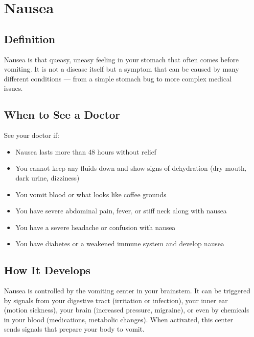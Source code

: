 \chapter{Nausea}

\section*{Definition}
Nausea is that queasy, uneasy feeling in your stomach that often comes before vomiting. It is not a disease itself but a symptom that can be caused by many different conditions — from a simple stomach bug to more complex medical issues.

\section*{When to See a Doctor}
See your doctor if:
\begin{itemize}
  \item Nausea lasts more than 48 hours without relief
  \item You cannot keep any fluids down and show signs of dehydration (dry mouth, dark urine, dizziness)
  \item You vomit blood or what looks like coffee grounds
  \item You have severe abdominal pain, fever, or stiff neck along with nausea
  \item You have a severe headache or confusion with nausea
  \item You have diabetes or a weakened immune system and develop nausea
\end{itemize}

\section*{How It Develops}
Nausea is controlled by the vomiting center in your brainstem. It can be triggered by signals from your digestive tract (irritation or infection), your inner ear (motion sickness), your brain (increased pressure, migraine), or even by chemicals in your blood (medications, metabolic changes). When activated, this center sends signals that prepare your body to vomit.

